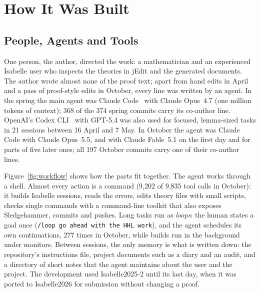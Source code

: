 \section{How It Was Built}\label{sec:process}

\subsection{People, Agents and Tools}

One person, the author, directed the work: a mathematician and an experienced Isabelle user who
inspects the theories in jEdit and the generated documents. The author wrote almost none of the proof
text; apart from hand edits in April and a pass of proof-style edits in October, every line was written by an
agent. In the spring the main agent was Claude Code~\cite{claudecode} with Claude Opus~4.7 (one
million tokens of context); 368 of the 374 spring commits carry its co-author line. OpenAI's Codex
CLI~\cite{codexcli} with GPT-5.4 was also used for focused, lemma-sized tasks in 21 sessions between
16 April and 7 May. In October the agent was Claude Code with Claude Opus~5.5, and with Claude Fable~5.1
on the first day and for parts of five later ones; all 197 October commits carry one of their
co-author lines.

Figure~\ref{fig:workflow} shows how the parts fit together. The agent works through a shell. Almost
every action is a command (9{,}202 of 9{,}835 tool calls in
October): it builds Isabelle sessions, reads the errors, edits theory files with small scripts, checks
single commands with a command-line toolkit that also exposes Sledgehammer, commits and pushes. Long
tasks run as \emph{loops}: the human states a goal once (\texttt{/loop go ahead with the HHL work}),
and the agent schedules its own continuations, 277 times in October, while builds run in the
background under monitors. Between sessions, the only memory is what is written down: the
repository's instructions file, project documents such as a diary and an audit, and a directory of
short notes that the agent maintains about the user and the project. The development used Isabelle2025-2
until its last day, when it was ported to Isabelle2026 for submission without changing a proof.


